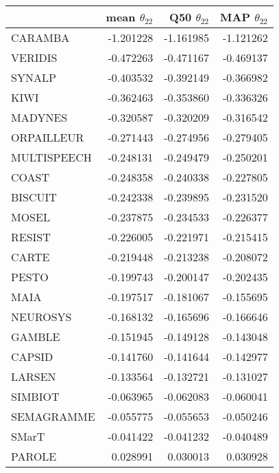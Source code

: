\begin{tabular}{lrrr}
\toprule
{} &  mean $\theta_{22}$ &  Q50 $\theta_{22}$ &  MAP $\theta_{22}$ \\
\midrule
CARAMBA     &           -1.201228 &          -1.161985 &          -1.121262 \\
VERIDIS     &           -0.472263 &          -0.471167 &          -0.469137 \\
SYNALP      &           -0.403532 &          -0.392149 &          -0.366982 \\
KIWI        &           -0.362463 &          -0.353860 &          -0.336326 \\
MADYNES     &           -0.320587 &          -0.320209 &          -0.316542 \\
ORPAILLEUR  &           -0.271443 &          -0.274956 &          -0.279405 \\
MULTISPEECH &           -0.248131 &          -0.249479 &          -0.250201 \\
COAST       &           -0.248358 &          -0.240338 &          -0.227805 \\
BISCUIT     &           -0.242338 &          -0.239895 &          -0.231520 \\
MOSEL       &           -0.237875 &          -0.234533 &          -0.226377 \\
RESIST      &           -0.226005 &          -0.221971 &          -0.215415 \\
CARTE       &           -0.219448 &          -0.213238 &          -0.208072 \\
PESTO       &           -0.199743 &          -0.200147 &          -0.202435 \\
MAIA        &           -0.197517 &          -0.181067 &          -0.155695 \\
NEUROSYS    &           -0.168132 &          -0.165696 &          -0.166646 \\
GAMBLE      &           -0.151945 &          -0.149128 &          -0.143048 \\
CAPSID      &           -0.141760 &          -0.141644 &          -0.142977 \\
LARSEN      &           -0.133564 &          -0.132721 &          -0.131027 \\
SIMBIOT     &           -0.063965 &          -0.062083 &          -0.060041 \\
SEMAGRAMME  &           -0.055775 &          -0.055653 &          -0.050246 \\
SMarT       &           -0.041422 &          -0.041232 &          -0.040489 \\
PAROLE      &            0.028991 &           0.030013 &           0.030928 \\
\bottomrule
\end{tabular}
